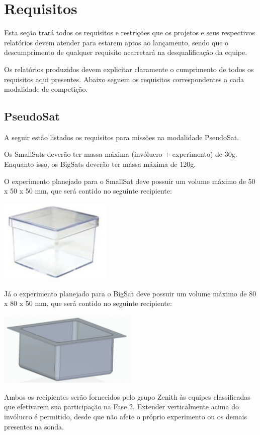 \section{Requisitos}

    Esta seção trará todos os requisitos e restrições que os projetos e seus respectivos relatórios devem atender para estarem aptos ao lançamento, sendo que o descumprimento de qualquer requisito acarretará na desqualificação da equipe.
    
    Os relatórios produzidos devem explicitar claramente o cumprimento de todos os requisitos aqui presentes. Abaixo seguem os requisitos correspondentes a cada modalidade de competição.

    \subsection{PseudoSat}    
    A seguir estão listados os requisitos para missões na modalidade PseudoSat.

    \begin{definition}[1]
    Os SmallSats deverão ter massa máxima (invólucro + experimento) de 30g. Enquanto isso, os BigSats deverão ter massa máxima de 120g.
    \end{definition}
    
    \begin{definition}[2]
    O experimento planejado para o SmallSat deve possuir um volume máximo de 50 x 50 x 50 mm, que será contido no seguinte recipiente:
    
    \centering\includegraphics[width=0.4\textwidth]{Figures/smallsat.png}
    
    \justifying Já o experimento planejado para o BigSat deve possuir um volume máximo de 80 x 80 x 50 mm, que será contido no seguinte recipiente:
    
    \centering\includegraphics[width=0.5\textwidth]{Figures/bigsat.png}
    
    \justifying Ambos os recipientes serão fornecidos pelo grupo Zenith às equipes classificadas que efetivarem sua participação na Fase 2. Extender verticalmente acima do invólucro é permitido, desde que não afete o próprio experimento ou os demais presentes na sonda.
    \end{definition}
    
